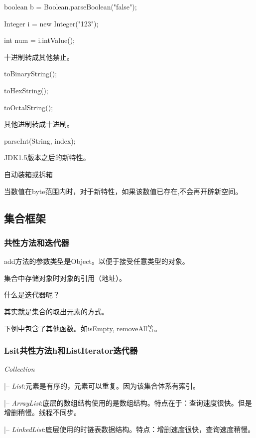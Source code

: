 \documentclass[UTF8]{ctexart}
\begin{document}
\qquad boolean b = Boolean.parseBoolean("false");

\qquad Integer i = new Integer("123");

\qquad int num = i.intValue();

十进制转成其他禁止。

\textbullet toBinaryString();

\textbullet toHexString();

\textbullet toOctalString();

其他进制转成十进制。

\textbullet parseInt(String, index);



JDK1.5版本之后的新特性。

\textbullet 自动装箱或拆箱

\textbullet 当数值在byte范围内时，对于新特性，如果该数值已存在,不会再开辟新空间。



\subsection{集合框架}
\subsubsection{共性方法和迭代器}

\textbullet add方法的参数类型是Object。以便于接受任意类型的对象。

\textbullet 集合中存储对象时对象的引用（地址）。

什么是迭代器呢？

其实就是集合的取出元素的方式。

下例中包含了其他函数。如isEmpty, removeAll等。


\subsubsection{Lsit共性方法h和ListIterator迭代器}

\textit{Collection}

\qquad |-- \textit{List}:元素是有序的，元素可以重复。因为该集合体系有索引。

\qquad \qquad |-- \textit{ArrayList}:底层的数组结构使用的是数组结构。特点在于：查询速度很快。但是增删稍慢。线程不同步。

\qquad \qquad |-- \textit{LinkedList}:底层使用的时链表数据结构。特点：增删速度很快，查询速度稍慢。
\end{document}
